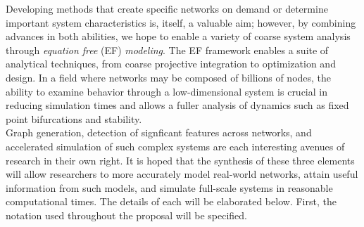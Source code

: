\documentclass[11pt]{article}
\begin{document}
\indent Developing methods that create specific networks on demand or determine important system characteristics is, itself, a valuable aim; however, by combining advances in both abilities, we hope to enable a variety of coarse system analysis through \textit{equation free} (EF) \textit{modeling}. The EF framework enables a suite of analytical techniques, from coarse projective integration to optimization and design. In a field where networks may be composed of billions of nodes, the ability to examine behavior through a low-dimensional system is crucial in reducing simulation times and allows a fuller analysis of dynamics such as fixed point bifurcations and stability.\vspace{1mm}\\
\indent Graph generation, detection of signficant features across networks, and accelerated simulation of such complex systems are each interesting avenues of research in their own right. It is hoped that the synthesis of these three elements will allow researchers to more accurately model real-world networks, attain useful information from such models, and simulate full-scale systems in reasonable computational times. The details of each will be elaborated below. First, the notation used throughout the proposal will be specified.
\end{document}
